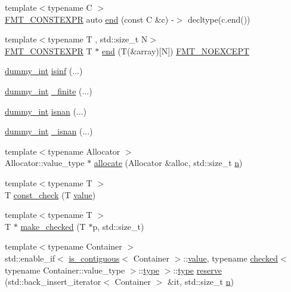 \begin{DoxyCompactItemize}
\item 
{\footnotesize template$<$typename C $>$ }\\\hyperlink{core_8h_a69201cb276383873487bf68b4ef8b4cd}{F\+M\+T\+\_\+\+C\+O\+N\+S\+T\+E\+X\+PR} auto \hyperlink{namespaceinternal_a94820de1710dc8038fa6f188adfe299b}{end} (const C \&c) -\/$>$ decltype(c.\+end())
\item 
{\footnotesize template$<$typename T , std\+::size\+\_\+t N$>$ }\\\hyperlink{core_8h_a69201cb276383873487bf68b4ef8b4cd}{F\+M\+T\+\_\+\+C\+O\+N\+S\+T\+E\+X\+PR} T $\ast$ \hyperlink{namespaceinternal_a34c313e1f4002b986a957f6e9b83f32a}{end} (T(\&array)\mbox{[}N\mbox{]}) \hyperlink{core_8h_aef128913e8400683b1cbd1a3a2e11df3}{F\+M\+T\+\_\+\+N\+O\+E\+X\+C\+E\+PT}
\item 
\hyperlink{structinternal_1_1dummy__int}{dummy\+\_\+int} \hyperlink{namespaceinternal_a39a08170fba78142a8aca3a624c415ee}{isinf} (...)
\item 
\hyperlink{structinternal_1_1dummy__int}{dummy\+\_\+int} \hyperlink{namespaceinternal_a46665e2f4ec2c5f429bae100fe461b47}{\+\_\+finite} (...)
\item 
\hyperlink{structinternal_1_1dummy__int}{dummy\+\_\+int} \hyperlink{namespaceinternal_ab13e871d0d819d1bb3b965e2196391cc}{isnan} (...)
\item 
\hyperlink{structinternal_1_1dummy__int}{dummy\+\_\+int} \hyperlink{namespaceinternal_a29338fd1e0c44c56648c890308cdf0e0}{\+\_\+isnan} (...)
\item 
{\footnotesize template$<$typename Allocator $>$ }\\Allocator\+::value\+\_\+type $\ast$ \hyperlink{namespaceinternal_a206460458512df6c652fd536d62dfda8}{allocate} (Allocator \&alloc, std\+::size\+\_\+t \hyperlink{format_8h_a9ab7e5832cef391eb8b1505a601fb215}{n})
\item 
{\footnotesize template$<$typename T $>$ }\\T \hyperlink{namespaceinternal_ab4bd4ce115d79a68ea0f8f03e6cf8988}{const\+\_\+check} (T \hyperlink{classinternal_1_1value}{value})
\item 
{\footnotesize template$<$typename T $>$ }\\T $\ast$ \hyperlink{namespaceinternal_a887ca8a3160ba683e62bd9d7418e821f}{make\+\_\+checked} (T $\ast$p, std\+::size\+\_\+t)
\item 
{\footnotesize template$<$typename Container $>$ }\\std\+::enable\+\_\+if$<$ \hyperlink{structis__contiguous}{is\+\_\+contiguous}$<$ Container $>$\+::\hyperlink{classinternal_1_1value}{value}, typename \hyperlink{structinternal_1_1checked}{checked}$<$ typename Container\+::value\+\_\+type $>$\+::\hyperlink{namespaceinternal_a8661864098ac0acff9a6dd7e66f59038}{type} $>$\+::\hyperlink{namespaceinternal_a8661864098ac0acff9a6dd7e66f59038}{type} \hyperlink{namespaceinternal_ac4b0a3ecf8e30e217ef1dacb83170118}{reserve} (std\+::back\+\_\+insert\+\_\+iterator$<$ Container $>$ \&it, std\+::size\+\_\+t \hyperlink{format_8h_a9ab7e5832cef391eb8b1505a601fb215}{n})

\end{DoxyCompactItemize}

